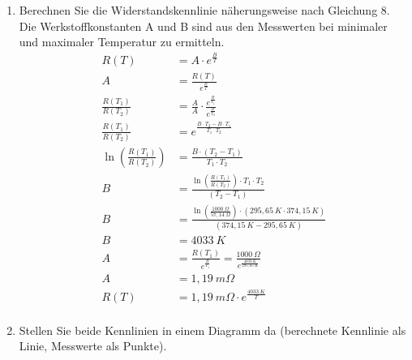 \begin{enumerate}[label=\alph*)]
	\item Berechnen Sie die Widerstandskennlinie näherungsweise nach Gleichung 8. Die Werkstoffkonstanten A und B sind aus den Messwerten bei minimaler und maximaler Temperatur zu ermitteln.
	      \begin{align*}
		      R(T)                                    & = A\cdot e^{\frac{B}{T}}                                                                \\
		      A                                       & = \frac{R(T)}{e^{\frac{B}{T}}}                                                          \\
		      \frac{R(T_1)}{R(T_2)}                   & = \frac{A}{A} \cdot \frac{e^{\frac{B}{T_1}}}{e^{\frac{B}{T_2}}}                         \\
		      \frac{R(T_1)}{R(T_2)}                   & = e^{\frac{B\cdot T_2-B\cdot T_1}{T_1\cdot T_2}}                                        \\
		      \ln \left(\frac{R(T_1)}{R(T_2)} \right) & = {\frac{B\cdot( T_2- T_1)}{T_1\cdot T_2}}                                              \\
		      B                                       & =\frac{\ln \left(\frac{R(T_1)}{R(T_2)} \right)\cdot {T_1\cdot T_2}}{( T_2- T_1)}        \\
		      B                                       & =\frac{\ln \left(\frac{1000\ \Omega}{57,14\ \Omega}\right)
		      \cdot {(295,65\ K \cdot 374,15\ K)}}{(374,15\ K - 295,65\ K)}                                                                     \\
		      B                                       & =4033\ K                                                                                \\
		      A                                       & = \frac{R(T_1)}{e^{\frac{B}{T_1}}} = \frac{1000\ \Omega}{e^{\frac{4033\ K}{295,65\ K}}} \\
		      A                                       & = 1,19\ m\Omega                                                                         \\
		      R(T)                                    & = 1,19\ m\Omega \cdot e^{\frac{4033\ K}{T}}                                             \\
	      \end{align*}
	\item Stellen Sie beide Kennlinien in einem Diagramm da (berechnete Kennlinie als Linie, Messwerte als Punkte).

\end{enumerate}
